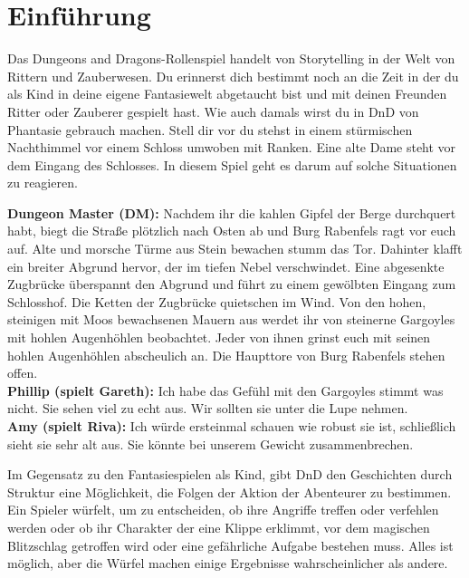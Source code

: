 \chapter{Einführung}
Das Dungeons and Dragons-Rollenspiel handelt von Storytelling in der Welt von Rittern und Zauberwesen. Du erinnerst dich bestimmt noch an die Zeit in der du als Kind in deine eigene Fantasiewelt abgetaucht bist und mit deinen Freunden Ritter oder Zauberer gespielt hast. Wie auch damals wirst du in  DnD von Phantasie gebrauch machen. Stell dir vor du stehst in einem stürmischen Nachthimmel vor einem Schloss umwoben mit Ranken. Eine alte Dame steht vor dem Eingang des Schlosses. In diesem Spiel geht es darum auf solche Situationen zu reagieren.

\begin{quotebox}
\textbf{Dungeon Master (DM):}
Nachdem ihr die kahlen Gipfel der Berge durchquert habt, biegt die Straße plötzlich nach Osten ab und Burg Rabenfels ragt vor euch auf. Alte und morsche Türme aus Stein bewachen stumm das Tor. Dahinter klafft ein breiter Abgrund hervor, der im tiefen Nebel verschwindet. Eine abgesenkte Zugbrücke überspannt den Abgrund und führt zu einem gewölbten Eingang zum Schlosshof. Die Ketten der Zugbrücke quietschen im Wind. Von den hohen, steinigen mit Moos bewachsenen Mauern aus werdet ihr von steinerne Gargoyles mit hohlen Augenhöhlen beobachtet. Jeder von ihnen grinst euch mit seinen hohlen Augenhöhlen abscheulich an.  Die Haupttore von Burg Rabenfels stehen offen.\\
\textbf{Phillip (spielt Gareth):} Ich habe das Gefühl mit den Gargoyles stimmt was nicht. Sie sehen viel zu echt aus. Wir sollten sie unter die Lupe nehmen.\\
\textbf{Amy (spielt Riva):} Ich würde ersteinmal schauen wie robust sie ist, schließlich sieht sie sehr alt aus. Sie könnte bei unserem Gewicht zusammenbrechen.
\end{quotebox}

Im Gegensatz zu den Fantasiespielen als Kind, gibt DnD den Geschichten durch Struktur eine Möglichkeit, die Folgen der Aktion der Abenteurer zu bestimmen. Ein Spieler würfelt, um zu entscheiden, ob ihre Angriffe treffen oder verfehlen werden oder ob ihr Charakter der eine Klippe erklimmt, vor dem magischen Blitzschlag getroffen wird oder eine gefährliche Aufgabe bestehen muss. Alles ist möglich, aber die Würfel machen einige Ergebnisse wahrscheinlicher als andere.

